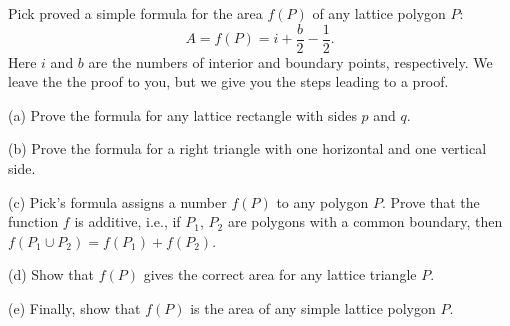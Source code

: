 Pick proved a simple formula for the area $f(P)$ of any lattice polygon $P$:
\[ A = f(P) = i + \frac{b}{2} - \frac{1}{2}. \]
Here $i$ and $b$ are the numbers of interior and boundary points, respectively. We leave the the proof to you, but we give you the steps leading to a proof.

(a) Prove the formula for any lattice rectangle with sides $p$ and $q$.

(b) Prove the formula for a right triangle with one horizontal and one vertical side.

(c) Pick's formula assigns a number $f(P)$ to any polygon $P$. Prove that the function $f$ is additive, i.e., if $P_1$, $P_2$ are polygons with a common boundary, then $f(P_1 \cup P_2) = f(P_1) + f(P_2)$.

(d) Show that $f(P)$ gives the correct area for any lattice triangle $P$.

(e) Finally, show that $f(P)$ is the area of any simple lattice polygon $P$.
